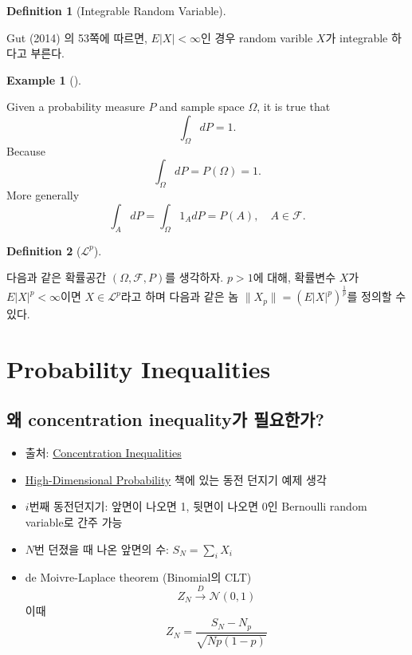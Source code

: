 \documentclass[
  letterpaper,
  DIV=11,
  numbers=noendperiod]{scrreprt}
\providecommand{\tightlist}{%
  \setlength{\itemsep}{0pt}\setlength{\parskip}{0pt}}\usepackage{longtable,booktabs,array}
\theoremstyle{plain}
\theoremstyle{definition}
\newtheorem{example}{Example}[chapter]
\theoremstyle{definition}
\newtheorem{definition}{Definition}[chapter]
\theoremstyle{plain}
\theoremstyle{plain}
\theoremstyle{remark}
\begin{document}
\begin{definition}[Integrable Random
Variable]\protect\hypertarget{def-integrablerv}{}\label{def-integrablerv}

Gut (2014) 의 53쪽에 따르면, \(E|X|<\infty\)인 경우 random varible
\(X\)가 integrable 하다고 부른다.

\end{definition}

\begin{example}[]\protect\hypertarget{exm-lebesgueprob}{}\label{exm-lebesgueprob}

Given a probability measure \(P\) and sample space \(\Omega\), it is
true that \[
\int_{\Omega} dP = 1.
\] Because \[
\int_{\Omega} dP = P(\Omega) = 1.
\] More generally \[
\int_A dP = \int_{\Omega} 1_A dP = P(A), \quad{} A \in \mathcal{F}.
\]

\end{example}

\begin{definition}[\(\mathcal{L}^p\)]\protect\hypertarget{def-Lp}{}\label{def-Lp}

다음과 같은 확률공간 \((\Omega, \mathcal{F}, P)\)를 생각하자. \(p>1\)에
대해, 확률변수 \(X\)가 \(E|X|^p < \infty\)이면
\(X\in \mathcal{L}^p\)라고 하며 다음과 같은 놈
\(\|X_p\| = (E|X|^p)^{\frac{1}{p}}\)를 정의할 수 있다.

\end{definition}

\chapter{Probability Inequalities}\label{probability-inequalities}

\section{왜 concentration inequality가
필요한가?}\label{uxc65c-concentration-inequalityuxac00-uxd544uxc694uxd55cuxac00}

\begin{itemize}
\tightlist
\item
  출처:
  \href{https://gclinderman.github.io/blog/probability/2018/01/07/concentration-inequalities.html}{Concentration
  Inequalities}
\end{itemize}

\begin{itemize}
\item
  \href{https://www.math.uci.edu/~rvershyn/papers/HDP-book/HDP-book.html}{High-Dimensional
  Probability} 책에 있는 동전 던지기 예제 생각
\item
  \(i\)번째 동전던지기: 앞면이 나오면 1, 뒷면이 나오면 0인 Bernoulli
  random variable로 간주 가능
\item
  \(N\)번 던졌을 때 나온 앞면의 수: \(S_N = \sum_i X_i\)
\item
  de Moivre-Laplace theorem (Binomial의 CLT) \[
  Z_N \stackrel{D}{\rightarrow}\mathcal{N}(0,1)
  \] 이때 \[
  Z_N  = \frac{S_N - N_p}{\sqrt{Np (1-p)}}
  \]
\end{itemize}
\end{document}
